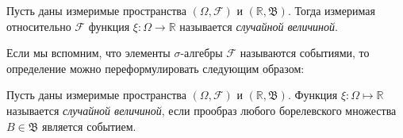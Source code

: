 \begin{defn}
    Пусть даны измеримые пространства $(\Omega, \mathcal{F})$ и $(\mathbb{R}, \mathfrak{B})$. 
    Тогда измеримая относительно $\mathcal{F}$ функция $\xi \colon \Omega \to \mathbb{R}$ называется \textit{случайной величиной}.
\end{defn}
\begin{rmrk}
    Если мы вспомним, что элементы $\sigma$-алгебры $\mathcal{F}$ называются событиями, то определение можно переформулировать следующим образом: 
    
    Пусть даны измеримые пространства $(\Omega, \mathcal{F})$ и $(\mathbb{R}, \mathfrak{B})$. 
    Функция $\xi \colon \Omega \mapsto \mathbb{R}$ называется \textit{случайной величиной}, если прообраз любого борелевского множества $B \in \mathfrak{B}$ является событием.
\end{rmrk}
